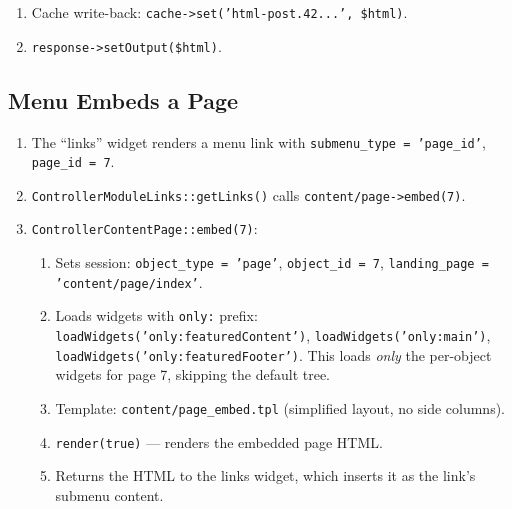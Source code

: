 \documentclass[11pt,a4paper]{article}
\begin{document}
\begin{enumerate}[leftmargin=1.6em,itemsep=2pt]
\begin{enumerate}[itemsep=2pt]
\begin{itemize}[itemsep=2pt]
                        controller).
                  \item Fetches \texttt{content/post.tpl}, which
                        includes \texttt{widgets-common.tpl}, which
                        includes \texttt{widgets-rows.tpl}, which emits
                        \texttt{\{\%widget\_name\%\}} tokens.
                  \item Substitutes tokens with widget HTML.
                  \item Post-processes HTML (strip comments, collapse
                        whitespace).
                  \item Returns the final HTML.
                \end{itemize}
          \item Cache write-back: \texttt{cache->set('html-post.42...',
                \$html)}.
          \item \texttt{response->setOutput(\$html)}.
        \end{enumerate}
\end{enumerate}

\subsection{Menu Embeds a Page}

\begin{enumerate}[leftmargin=1.6em,itemsep=2pt]
  \item The ``links'' widget renders a menu link with
        \texttt{submenu\_type = 'page\_id'},
        \texttt{page\_id = 7}.
  \item \texttt{ControllerModuleLinks::getLinks()} calls
        \texttt{content/page->embed(7)}.
  \item \texttt{ControllerContentPage::embed(7)}:
        \begin{enumerate}[itemsep=2pt]
          \item Sets session: \texttt{object\_type = 'page'},
                \texttt{object\_id = 7},
                \texttt{landing\_page = 'content/page/index'}.
          \item Loads widgets with \texttt{only:} prefix:
                \texttt{loadWidgets('only:featuredContent')},
                \texttt{loadWidgets('only:main')},
                \texttt{loadWidgets('only:featuredFooter')}. This loads
                \emph{only} the per-object widgets for page 7, skipping
                the default tree.
          \item Template: \texttt{content/page\_embed.tpl} (simplified
                layout, no side columns).
          \item \texttt{render(true)} --- renders the embedded page
                HTML.
          \item Returns the HTML to the links widget, which inserts it
                as the link's submenu content.
        \end{enumerate}
\end{enumerate}
\end{document}
